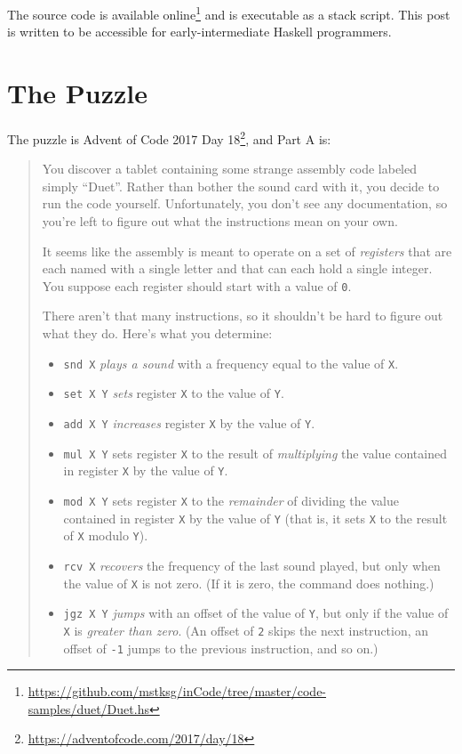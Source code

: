 \documentclass[]{article}
\renewcommand{\href}[2]{#2\footnote{\url{#1}}}
\begin{document}
The source code is
\href{https://github.com/mstksg/inCode/tree/master/code-samples/duet/Duet.hs}{available
online} and is executable as a stack script. This post is written to be
accessible for early-intermediate Haskell programmers.

\section{The Puzzle}\label{the-puzzle}

The puzzle is \href{https://adventofcode.com/2017/day/18}{Advent of Code 2017
Day 18}, and Part A is:

\begin{quote}
You discover a tablet containing some strange assembly code labeled simply
``Duet''. Rather than bother the sound card with it, you decide to run the code
yourself. Unfortunately, you don't see any documentation, so you're left to
figure out what the instructions mean on your own.

It seems like the assembly is meant to operate on a set of \emph{registers} that
are each named with a single letter and that can each hold a single integer. You
suppose each register should start with a value of \texttt{0}.

There aren't that many instructions, so it shouldn't be hard to figure out what
they do. Here's what you determine:

\begin{itemize}
\tightlist
\item
  \texttt{snd\ X} \emph{plays a sound} with a frequency equal to the value of
  \texttt{X}.
\item
  \texttt{set\ X\ Y} \emph{sets} register \texttt{X} to the value of \texttt{Y}.
\item
  \texttt{add\ X\ Y} \emph{increases} register \texttt{X} by the value of
  \texttt{Y}.
\item
  \texttt{mul\ X\ Y} sets register \texttt{X} to the result of
  \emph{multiplying} the value contained in register \texttt{X} by the value of
  \texttt{Y}.
\item
  \texttt{mod\ X\ Y} sets register \texttt{X} to the \emph{remainder} of
  dividing the value contained in register \texttt{X} by the value of \texttt{Y}
  (that is, it sets \texttt{X} to the result of \texttt{X} modulo \texttt{Y}).
\item
  \texttt{rcv\ X} \emph{recovers} the frequency of the last sound played, but
  only when the value of \texttt{X} is not zero. (If it is zero, the command
  does nothing.)
\item
  \texttt{jgz\ X\ Y} \emph{jumps} with an offset of the value of \texttt{Y}, but
  only if the value of \texttt{X} is \emph{greater than zero}. (An offset of
  \texttt{2} skips the next instruction, an offset of \texttt{-1} jumps to the
  previous instruction, and so on.)
\end{itemize}


\end{quote}
\end{document}
